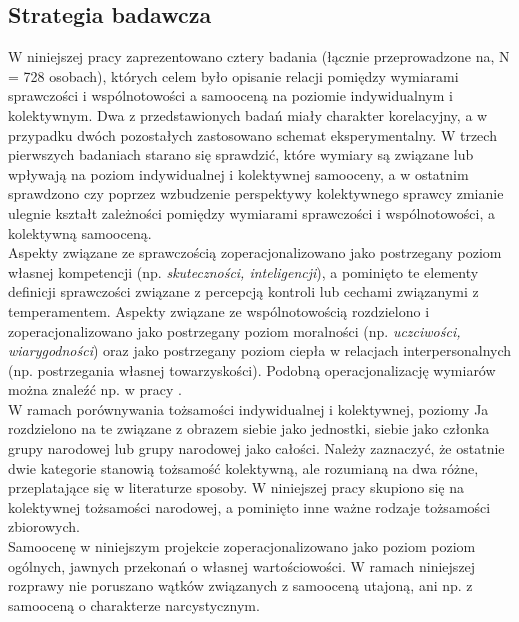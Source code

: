 \documentclass[man]{apa6}
\begin{document}
\subsection{Strategia badawcza}

W niniejszej pracy zaprezentowano cztery badania (łącznie przeprowadzone na, N = 728 osobach), których celem było opisanie relacji pomiędzy wymiarami sprawczości i wspólnotowości a samooceną na poziomie indywidualnym i kolektywnym. Dwa z przedstawionych badań miały charakter korelacyjny, a w przypadku dwóch pozostałych zastosowano schemat eksperymentalny. W trzech pierwszych badaniach starano się sprawdzić, które wymiary są związane lub wpływają na poziom indywidualnej i kolektywnej samooceny, a w ostatnim sprawdzono czy poprzez wzbudzenie perspektywy kolektywnego sprawcy zmianie ulegnie kształt zależności pomiędzy wymiarami sprawczości i wspólnotowości, a kolektywną samooceną. \\
Aspekty związane ze sprawczością zoperacjonalizowano jako postrzegany poziom własnej kompetencji (np. \emph{skuteczności, inteligencji}), a pominięto te elementy definicji sprawczości związane z percepcją kontroli lub cechami związanymi z temperamentem. Aspekty związane ze wspólnotowością rozdzielono i zoperacjonalizowano jako postrzegany poziom moralności (np. \emph{uczciwości, wiarygodności}) oraz jako postrzegany poziom ciepła w relacjach interpersonalnych (np. postrzegania własnej towarzyskości). Podobną operacjonalizację wymiarów można znaleźć np. w pracy \textcite{leach2007group}.\\
W ramach porównywania tożsamości indywidualnej i kolektywnej, poziomy Ja rozdzielono na te związane z obrazem siebie jako jednostki, siebie jako członka grupy narodowej lub grupy narodowej jako całości. Należy zaznaczyć, że ostatnie dwie kategorie stanowią tożsamość kolektywną, ale rozumianą na dwa różne, przeplatające się w literaturze sposoby. W niniejszej pracy skupiono się na kolektywnej tożsamości narodowej, a pominięto inne ważne rodzaje tożsamości zbiorowych.\\
Samoocenę w niniejszym projekcie zoperacjonalizowano jako poziom poziom ogólnych, jawnych przekonań o własnej wartościowości. W ramach niniejszej rozprawy nie poruszano wątków związanych z samooceną utajoną, ani np. z samooceną o charakterze narcystycznym.
\end{document}
